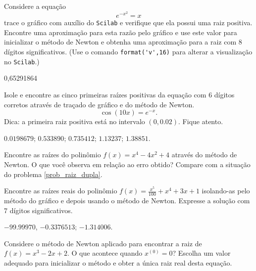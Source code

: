 \ifisscilab
\begin{Exercise}\label{new1} Considere a equação
  $$e^{-x^2}=x$$
trace o gráfico com auxílio do \verb+Scilab+ e verifique que ela possui uma raiz positiva. Encontre uma aproximação para esta razão pelo gráfico e use este valor para inicializar o método de Newton e obtenha uma aproximação para a raiz com 8 dígitos significativos. (Use o comando \verb+format('v',16)+ para alterar a visualização no \verb+Scilab+.)
\end{Exercise}
\begin{Answer}
  \begin{tiny}
0,65291864    
  \end{tiny}
\end{Answer}
\fi

\begin{Exercise}\label{new2} Isole e encontre as cinco primeiras raízes positivas da equação com 6 dígitos corretos através de traçado de gráfico e do método de Newton.
$$\cos(10x)=e^{-x}.$$ Dica: a primeira raiz positiva está no intervalo $(0,0.02)$. Fique atento.
\end{Exercise}
\begin{Answer}
  \begin{tiny}
 $0.0198679$; $0.533890$; $0.735412$; $1.13237$; $1.38851$.
  \end{tiny}
\end{Answer}


\begin{Exercise}\label{new3} Encontre as raízes do polinômio $f(x)=x^4-4x^2+4$ através do método de Newton. O que você observa em relação ao erro obtido? Compare com a situação do problema \ref{prob_raiz_dupla}.
\end{Exercise}

\begin{Exercise}\label{new4} Encontre as raízes reais do polinômio $f(x)=\frac{x^5}{100}+x^4+3x+1$ isolando-as pelo método do gráfico e depois usando o método de Newton. Expresse a solução com 7 dígitos significativos.
\end{Exercise}
\begin{Answer}
  \begin{tiny}
$-99.99970$, $-0.3376513$; $-1.314006$.
  \end{tiny}
\end{Answer}

\begin{Exercise}Considere o método de Newton aplicado para encontrar a raiz de $f(x)=x^3-2x+2$. O que acontece quando $x^{(0)}=0$? Escolha um valor adequado para inicializar o método e obter a única raiz real desta equação.
\end{Exercise}

